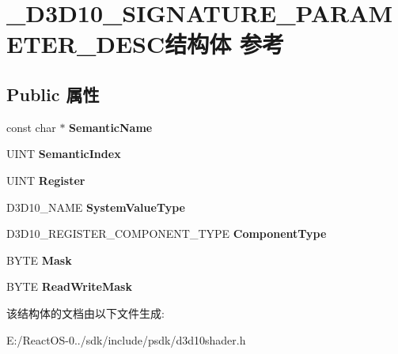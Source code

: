 \hypertarget{struct___d3_d10___s_i_g_n_a_t_u_r_e___p_a_r_a_m_e_t_e_r___d_e_s_c}{}\section{\+\_\+\+D3\+D10\+\_\+\+S\+I\+G\+N\+A\+T\+U\+R\+E\+\_\+\+P\+A\+R\+A\+M\+E\+T\+E\+R\+\_\+\+D\+E\+S\+C结构体 参考}
\label{struct___d3_d10___s_i_g_n_a_t_u_r_e___p_a_r_a_m_e_t_e_r___d_e_s_c}
\subsection*{Public 属性}
\begin{DoxyCompactItemize}
\item 
\mbox{\label{struct___d3_d10___s_i_g_n_a_t_u_r_e___p_a_r_a_m_e_t_e_r___d_e_s_c_addae5dec59f027a7793f46a1923f16c0}} 
const char $\ast$ {\bfseries Semantic\+Name}
\item 
\mbox{\label{struct___d3_d10___s_i_g_n_a_t_u_r_e___p_a_r_a_m_e_t_e_r___d_e_s_c_aa90a43ada0d04ddeac1e2cac5566f534}} 
U\+I\+NT {\bfseries Semantic\+Index}
\item 
\mbox{\label{struct___d3_d10___s_i_g_n_a_t_u_r_e___p_a_r_a_m_e_t_e_r___d_e_s_c_aa93688be87923ce82800886b52e2ac98}} 
U\+I\+NT {\bfseries Register}
\item 
\mbox{\label{struct___d3_d10___s_i_g_n_a_t_u_r_e___p_a_r_a_m_e_t_e_r___d_e_s_c_a01beaa0ca398374c8073c94858c58976}} 
D3\+D10\+\_\+\+N\+A\+ME {\bfseries System\+Value\+Type}
\item 
\mbox{\label{struct___d3_d10___s_i_g_n_a_t_u_r_e___p_a_r_a_m_e_t_e_r___d_e_s_c_ae76992293080c3e61cdaf1cf40c6a3d1}} 
D3\+D10\+\_\+\+R\+E\+G\+I\+S\+T\+E\+R\+\_\+\+C\+O\+M\+P\+O\+N\+E\+N\+T\+\_\+\+T\+Y\+PE {\bfseries Component\+Type}
\item 
\mbox{\label{struct___d3_d10___s_i_g_n_a_t_u_r_e___p_a_r_a_m_e_t_e_r___d_e_s_c_a82be302e51672f97231741d7ee170f02}} 
B\+Y\+TE {\bfseries Mask}
\item 
\mbox{\label{struct___d3_d10___s_i_g_n_a_t_u_r_e___p_a_r_a_m_e_t_e_r___d_e_s_c_a2d02cd9fa6662a981a65c9a94024f56a}} 
B\+Y\+TE {\bfseries Read\+Write\+Mask}
\end{DoxyCompactItemize}


该结构体的文档由以下文件生成\+:\begin{DoxyCompactItemize}
\item 
E\+:/\+React\+O\+S-\/0../sdk/include/psdk/d3d10shader.\+h\end{DoxyCompactItemize}
